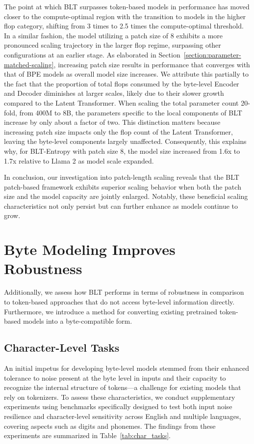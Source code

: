 The point at which {\textsc BLT} surpasses token-based models in performance has moved closer to the compute-optimal region with the transition to models in the higher flop category, shifting from 3 times to 2.5 times the compute-optimal threshold. In a similar fashion, the model utilizing a patch size of 8 exhibits a more pronounced scaling trajectory in the larger flop regime, surpassing other configurations at an earlier stage. As elaborated in Section~\ref{section:parameter-matched-scaling}, increasing patch size results in performance that converges with that of BPE models as overall model size increases. We attribute this partially to the fact that the proportion of total flops consumed by the byte-level Encoder and Decoder diminishes at larger scales, likely due to their slower growth compared to the Latent Transformer. When scaling the total parameter count 20-fold, from 400M to 8B, the parameters specific to the local components of {\textsc BLT} increase by only about a factor of two. This distinction matters because increasing patch size impacts only the flop count of the Latent Transformer, leaving the byte-level components largely unaffected. Consequently, this explains why, for {\textsc BLT}-Entropy with patch size 8, the model size increased from 1.6x to 1.7x relative to Llama 2 as model scale expanded.

In conclusion, our investigation into patch-length scaling reveals that the {\textsc BLT} patch-based framework exhibits superior scaling behavior when both the patch size and the model capacity are jointly enlarged. Notably, these beneficial scaling characteristics not only persist but can further enhance as models continue to grow.

\section{Byte Modeling Improves Robustness} Additionally, we assess how {\textsc BLT} performs in terms of robustness in comparison to token-based approaches that do not access byte-level information directly. Furthermore, we introduce a method for converting existing pretrained token-based models into a byte-compatible form.
\label{sec:robustness}

\subsection{Character-Level Tasks}

An initial impetus for developing byte-level models stemmed from their enhanced tolerance to noise present at the byte level in inputs and their capacity to recognize the internal structure of tokens—a challenge for existing models that rely on tokenizers. To assess these characteristics, we conduct supplementary experiments using benchmarks specifically designed to test both input noise resilience and character-level sensitivity across English and multiple languages, covering aspects such as digits and phonemes. The findings from these experiments are summarized in Table~\ref{tab:char_tasks}.

